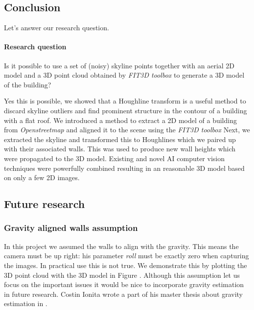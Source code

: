 \subsection{Conclusion}
Let's answer our research question.
\paragraph{Research question}
Is it possible to use a set of (noisy) skyline points together with an aerial
2D model and a 3D point cloud obtained by \emph{FIT3D toolbox\cite{FIT3D}} to generate a 3D model of the building?

Yes this is possible, we showed that a Houghline transform is a useful method to
discard skyline outliers and find prominent structure in the contour of a
building with a flat roof. We introduced a method to extract a 2D model of a
building from \emph{Openstreetmap\cite{Openstreetmap}} and aligned it to the
scene using the \emph{FIT3D toolbox\cite{FIT3D}} Next, we extracted the skyline
and transformed this to Houghlines which we paired up with their associated
walls. This was used to produce new wall heights which were propagated to the 3D
model.  Existing and novel AI computer vision techniques were powerfully
combined resulting in an reasonable 3D model based on only a few 2D images. 

\subsection{Future research}
\subsubsection{Gravity aligned walls assumption}
In this project we assumed the walls to align with the gravity.
This means the camera must be up right: his parameter \emph{roll} must be
exactly zero when capturing the images. 
In practical use this is not true. We demonstrate this by plotting the 3D point cloud
with the 3D model in Figure .
Although this assumption let us focus on the important issues it would be nice
to incorporate gravity estimation in future research.
Costin Ionita wrote a part of his master thesis about gravity estimation in
\cite{costin}.\\

